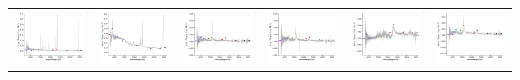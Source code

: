 \begin{center}
\begin{longtable}{l l l l l l }
    \includegraphics[width=0.3\linewidth, clip]{Figs/Figs-sdss/spec-3590-55201-0554-STRIPE82-0018-038274.pdf} & \includegraphics[width=0.3\linewidth, clip]{Figs/Figs-sdss/spec-3609-55201-0610-STRIPE82-0044-021486.pdf} & \includegraphics[width=0.3\linewidth, clip]{Figs/Figs-sdss/spec-3775-55207-0067-SPLUS-n03s19-045911.pdf} & \includegraphics[width=0.3\linewidth, clip]{Figs/Figs-sdss/spec-3776-55209-0054-SPLUS-n03s23-033092.pdf} & \includegraphics[width=0.3\linewidth, clip]{Figs/Figs-sdss/spec-3776-55209-0768-SPLUS-n02s22-016624.pdf} & \includegraphics[width=0.3\linewidth, clip]{Figs/Figs-sdss/spec-3777-55210-0616-SPLUS-n02s25-003956.pdf} \\

\end{longtable}
\end{center}

